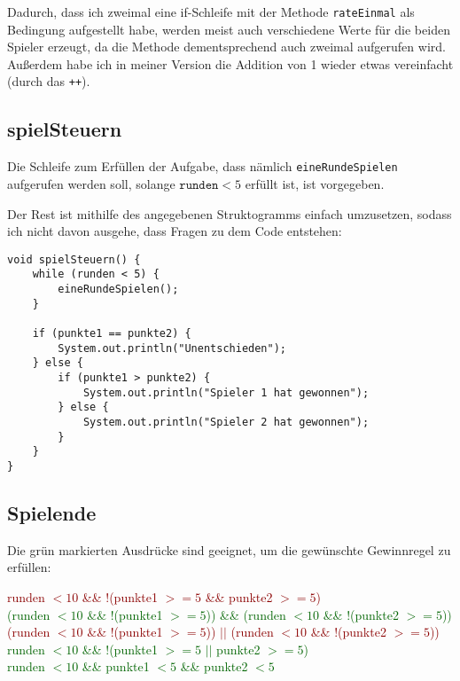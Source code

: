 \documentclass{scrartcl}   %
\begin{document}
Dadurch, dass ich zweimal eine if-Schleife mit der Methode \texttt{rateEinmal} als Bedingung aufgestellt habe, werden meist auch verschiedene Werte für die beiden Spieler erzeugt, da die Methode dementsprechend auch zweimal aufgerufen wird.\\
Außerdem habe ich in meiner Version die Addition von 1 wieder etwas vereinfacht (durch das \texttt{++}).

\newpage

\subsection{spielSteuern}

Die Schleife zum Erfüllen der Aufgabe, dass nämlich \texttt{eineRundeSpielen} aufgerufen werden soll, solange $\texttt{runden} < 5$ erfüllt ist, ist vorgegeben.

Der Rest ist mithilfe des angegebenen Struktogramms einfach umzusetzen, sodass ich nicht davon ausgehe, dass Fragen zu dem Code entstehen:\\
\begin{lstlisting}
void spielSteuern() {
    while (runden < 5) {
        eineRundeSpielen();
    }
    
    if (punkte1 == punkte2) {
        System.out.println("Unentschieden");
    } else {
        if (punkte1 > punkte2) {
            System.out.println("Spieler 1 hat gewonnen");
        } else {
            System.out.println("Spieler 2 hat gewonnen");
        }
    }
}
\end{lstlisting}

\subsection{Spielende}

Die grün markierten Ausdrücke sind geeignet, um die gewünschte Gewinnregel zu erfüllen:

\textcolor{darkred}{runden $< 10$ \&\& !(punkte1 $>= 5$ \&\& punkte2 $>= 5$)}\\
\textcolor{darkgreen}{(runden $< 10$ \&\& !(punkte1 $>= 5$)) \&\& (runden $< 10$ \&\& !(punkte2 $>= 5$))}\\
\textcolor{darkred}{(runden $< 10$ \&\& !(punkte1 $>= 5$)) $||$ (runden $< 10$ \&\& !(punkte2 $>= 5$))}\\
\textcolor{darkgreen}{runden $< 10$ \&\& !(punkte1 $>= 5$ $||$ punkte2 $>= 5$)}\\
\textcolor{darkgreen}{runden $< 10$ \&\& punkte1 $< 5$ \&\& punkte2 $< 5$}
\end{document}
